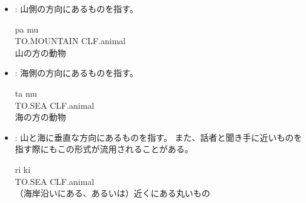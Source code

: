 \begin{itemize}
    \item {} : {山側}の方向にあるものを指す。
        \begin{exe}
            \ex \gll pa mu \\
            TO.MOUNTAIN CLF.animal \\
            \glt 山の方の動物
        \end{exe}
    \item {} : {海側}の方向にあるものを指す。
        \begin{exe}
            \ex \gll ta mu \\
            TO.SEA CLF.animal \\
            \glt 海の方の動物
        \end{exe}
    \item {} : 山と海に{垂直な方向}にあるものを指す。
    また、話者と聞き手に近いものを指す際にもこの形式が流用されることがある。
        \begin{exe}
            \ex \gll ri ki \\
            TO.SEA CLF.animal \\
            \glt （海岸沿いにある、あるいは）近くにある丸いもの
        \end{exe}
\end{itemize}
